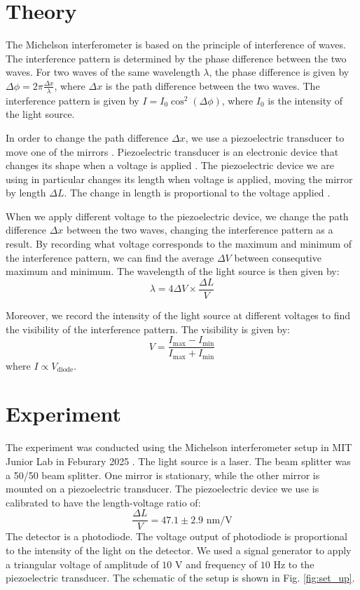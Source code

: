 \section{Theory}
The Michelson interferometer is based on the principle of interference of waves. The interference pattern is determined by the phase difference between the two waves. For two waves of the same wavelength $\lambda$, the phase difference is given by $\Delta \phi = 2\pi \frac{\Delta x}{\lambda}$, where $\Delta x$ is the path difference between the two waves. The interference pattern is given by $I = I_0 \cos^2(\Delta \phi)$, where $I_0$ is the intensity of the light source.

In order to change the path difference $\Delta x$, we use a piezoelectric transducer to move one of the mirrors \cite{MITOpticalInterferometry2023}. Piezoelectric transducer is an electronic device that changes its shape when a voltage is applied \cite{PiezoFilm2006}. The piezoelectric device we are using in particular changes its length when voltage is applied, moving the mirror by length $\Delta L$.  The change in length is proportional to the voltage applied \cite{MITOpticalInterferometry2023}. 

When we apply different voltage to the piezoelectric device, we change the path difference $\Delta x$ between the two waves, changing the interference pattern as a result. By recording what voltage corresponds to the maximum and minimum of the interference pattern, we can find the average $\Delta V$ between consequtive maximum and minimum. The wavelength of the light source is then given by:
\begin{equation}
    \lambda = 4 \Delta V \times \frac{\Delta L}{V} 
\end{equation}

Moreover, we record the intensity of the light source at different voltages to find the visibility of the interference pattern. The visibility is given by:
\begin{equation}
    V = \frac{I_{\text{max}} - I_{\text{min}}}{I_{\text{max}} + I_{\text{min}}}
\end{equation}
where $I \propto V_{\text{diode}}$. 


\section{Experiment}
The experiment was conducted using the Michelson interferometer setup in MIT Junior Lab in Feburary 2025 \cite{MITOpticalInterferometry2023}. The light source is a laser. The beam splitter was a 50/50 beam splitter. One mirror is stationary, while the other mirror is mounted on a piezoelectric transducer. The piezoelectric device we use is calibrated to have the length-voltage ratio of:
\begin{equation}
     \frac{\Delta L}{V} = 47.1\pm2.9 \text{ nm/V}
\end{equation}
The detector is a photodiode. The voltage output of photodiode is proportional to the intensity of the light on the detector. We used a signal generator to apply a triangular voltage of amplitude of $10 \text{ V}$ and frequency of $10 \text{ Hz}$ to the piezoelectric transducer. The schematic of the setup is shown in Fig. \ref{fig:set_up}.

